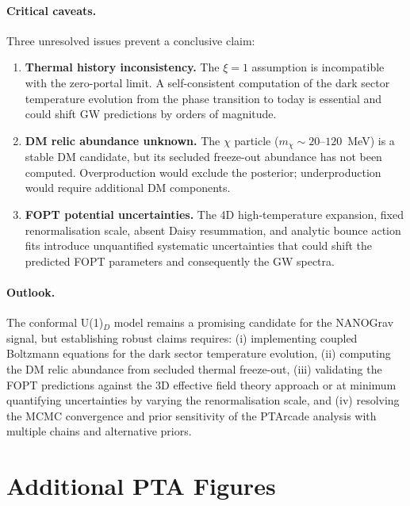 \documentclass[12pt,a4paper]{article}
\begin{document}
\paragraph{Critical caveats.}
Three unresolved issues prevent a conclusive claim:

\begin{enumerate}
\item \textbf{Thermal history inconsistency.} The $\xi = 1$ assumption is incompatible with the zero-portal limit. A self-consistent computation of the dark sector temperature evolution from the phase transition to today is essential and could shift GW predictions by orders of magnitude.
\item \textbf{DM relic abundance unknown.} The $\chi$ particle ($m_\chi \sim 20$--$120$~MeV) is a stable DM candidate, but its secluded freeze-out abundance has not been computed. Overproduction would exclude the posterior; underproduction would require additional DM components.
\item \textbf{FOPT potential uncertainties.} The 4D high-temperature expansion, fixed renormalisation scale, absent Daisy resummation, and analytic bounce action fits introduce unquantified systematic uncertainties that could shift the predicted FOPT parameters and consequently the GW spectra.
\end{enumerate}

\paragraph{Outlook.}
The conformal U(1)$_D$ model remains a promising candidate for the NANOGrav signal, but establishing robust claims requires: (i) implementing coupled Boltzmann equations for the dark sector temperature evolution, (ii) computing the DM relic abundance from secluded thermal freeze-out, (iii) validating the FOPT predictions against the 3D effective field theory approach or at minimum quantifying uncertainties by varying the renormalisation scale, and (iv) resolving the MCMC convergence and prior sensitivity of the PTArcade analysis with multiple chains and alternative priors.

\appendix
\section{Additional PTA Figures}
\end{document}
